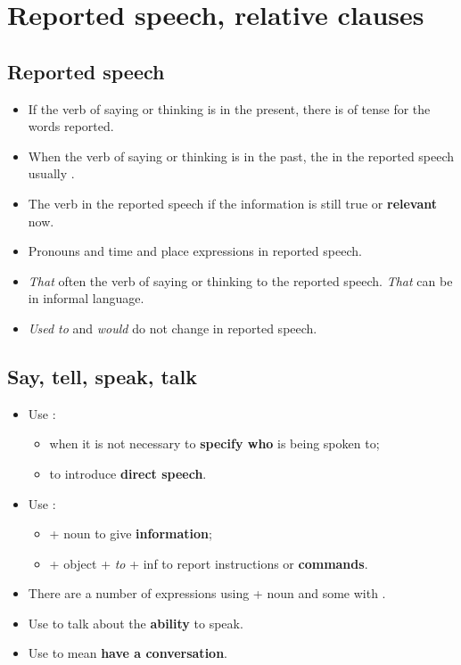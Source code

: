 \section{Reported speech, relative clauses}

\subsection{Reported speech}
\begin{itemize}
    \item If the verb of saying or thinking is in the present,
    there is  of tense for the words reported.
    \item When the verb of saying or thinking is in the past,
    the  in the reported speech usually .
    \item The verb in the reported speech 
    if the information is still true or \textbf{relevant} now.
    \item Pronouns and time and place expressions  in reported speech.
    \item \textit{That} often  the verb of saying or thinking to the reported speech.
    \textit{That} can be  in informal language.
    \item[\ast] \textit{Used to} and \textit{would} do not change in reported speech.
\end{itemize}

\subsection{Say, tell, speak, talk}
\begin{itemize}
    \item Use :
    \begin{itemize}
        \item when it is not necessary to \textbf{specify who} is being spoken to;
        \item to introduce \textbf{direct speech}.
    \end{itemize}
    \item Use :
    \begin{itemize}
              \item + noun to give \textbf{information};
              \item + object + \textit{to} + inf to report instructions or \textbf{commands}.
    \end{itemize}
    \item There are a number of expressions using  + noun and some with .
    \item Use  to talk about the \textbf{ability} to speak.
    \item Use  to mean \textbf{have a conversation}.
\end{itemize}

